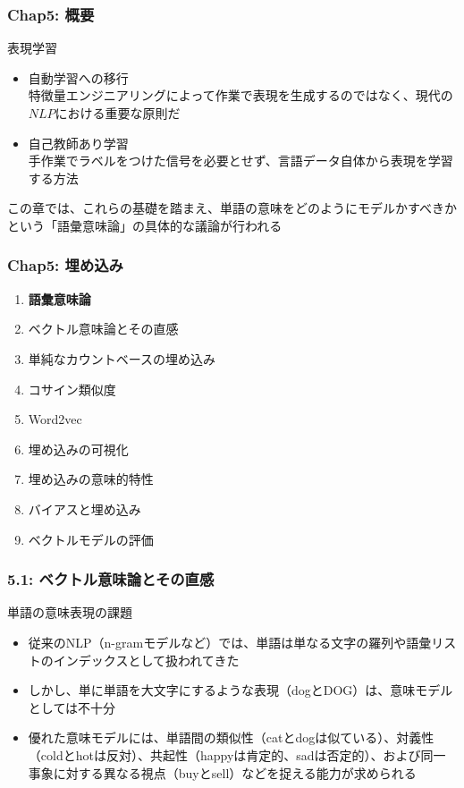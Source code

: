 \documentclass[unicode,11pt]{beamer} %
\begin{document}
\begin{frame}
    \frametitle{Chap5: 概要}
    \begin{alertblock}{表現学習}
        \begin{itemize}
            \item 自動学習への移行\\特徴量エンジニアリングによって作業で表現を生成するのではなく、現代の$NLP$における重要な原則だ
            \item 自己教師あり学習\\手作業でラベルをつけた信号を必要とせず、言語データ自体から表現を学習する方法
        \end{itemize}
        この章では、これらの基礎を踏まえ、単語の意味をどのようにモデルかすべきかという「語彙意味論」の具体的な議論が行われる
    \end{alertblock}
\end{frame}


\begin{frame}
    \frametitle{Chap5: 埋め込み}
    \begin{block}{}
        \begin{enumerate}
            \item {\color{red}\textbf{語彙意味論}}
            \item ベクトル意味論とその直感
            \item 単純なカウントベースの埋め込み
            \item コサイン類似度
            \item Word2vec
            \item 埋め込みの可視化
            \item 埋め込みの意味的特性
            \item バイアスと埋め込み
            \item ベクトルモデルの評価
        \end{enumerate}
    \end{block}
\end{frame}

\begin{frame}
    \frametitle{5.1: ベクトル意味論とその直感}
    \begin{alertblock}{単語の意味表現の課題}
        \begin{itemize}
            \item 従来のNLP（n-gramモデルなど）では、単語は単なる文字の羅列や語彙リストのインデックスとして扱われてきた
            \item しかし、単に単語を大文字にするような表現（dogとDOG）は、意味モデルとしては不十分
            \item 優れた意味モデルには、単語間の類似性（catとdogは似ている）、対義性（coldとhotは反対）、共起性（happyは肯定的、sadは否定的）、および同一事象に対する異なる視点（buyとsell）などを捉える能力が求められる
        \end{itemize}
    \end{alertblock}
\end{frame}
\end{document}
